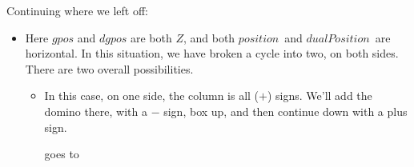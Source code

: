\documentclass[12pt]{article}
\numberwithin{equation}{section}
\newcommand{\horizontalDominoRSShift}[4]{\filldraw [dominoRSStyle] (#2 - 1 + #4 + \eps, #1 - 1 + \eps) rectangle + (2 - \teps, 1 -\teps) node [dominoText] {$#3$};}
\newcommand{\pos}{$position$}
\newcommand{\dpos}{$dualPosition$}
\begin{document}
  Continuing where we left off:
  \begin{itemize}
    \item Here $gpos$ and $dgpos$ are both $Z$, and both \pos\ and \dpos\ are horizontal.
    In this situation, we have broken a cycle into two, on both sides.
    There are two overall possibilities.
    \begin{itemize}
      \item In this case, on one side, the column is all ($+$) signs.
      We'll add the domino there, with a $-$ sign,
      box up, and then continue down with a plus sign.
      \begin{figure}[H]
        \centering
      \end{figure}
      goes to
      \begin{figure}[H]
        \centering
      \end{figure}


\end{itemize}
\end{itemize}
\end{document}
